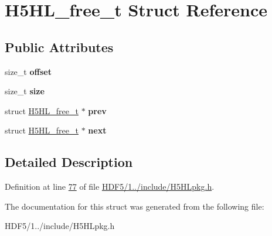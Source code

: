\hypertarget{struct_h5_h_l__free__t}{}\section{H5\+H\+L\+\_\+free\+\_\+t Struct Reference}
\label{struct_h5_h_l__free__t}
\subsection*{Public Attributes}
\begin{DoxyCompactItemize}
\item 
\mbox{\label{struct_h5_h_l__free__t_a34395af010afa5751ab963d9d3f8ef84}} 
size\+\_\+t {\bfseries offset}
\item 
\mbox{\label{struct_h5_h_l__free__t_aeed3dffc9f68487679c5ccdbe76270dc}} 
size\+\_\+t {\bfseries size}
\item 
\mbox{\label{struct_h5_h_l__free__t_a3243f4631c2161454ca2ed28fb0360c7}} 
struct \hyperlink{struct_h5_h_l__free__t}{H5\+H\+L\+\_\+free\+\_\+t} $\ast$ {\bfseries prev}
\item 
\mbox{\label{struct_h5_h_l__free__t_a65d80ce9f027bfb00a3facf4e04c3375}} 
struct \hyperlink{struct_h5_h_l__free__t}{H5\+H\+L\+\_\+free\+\_\+t} $\ast$ {\bfseries next}
\end{DoxyCompactItemize}


\subsection{Detailed Description}


Definition at line \hyperlink{_h_d_f5_21_810_81_2include_2_h5_h_lpkg_8h_source_l00077}{77} of file \hyperlink{_h_d_f5_21_810_81_2include_2_h5_h_lpkg_8h_source}{H\+D\+F5/1../include/\+H5\+H\+Lpkg.\+h}.



The documentation for this struct was generated from the following file\+:\begin{DoxyCompactItemize}
\item 
H\+D\+F5/1../include/\+H5\+H\+Lpkg.\+h\end{DoxyCompactItemize}
